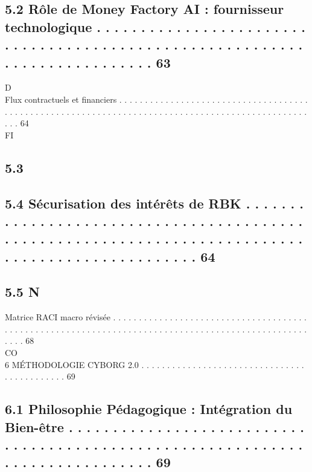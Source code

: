 \documentclass[12pt,landscape,a4paper]{article}
\begin{document}
\subsection{5.2     Rôle de Money Factory AI : fournisseur technologique . . . . . . . . . . . . . . . . . . . . . . . . . . . . . . . . . . . . . . . . . . . . . . . . . . . . . . . . . . . . . . . . . . . . . . . . . . . 63}
\vspace{0.5em}
\vspace{0.5em}
\vspace{0.5em}
\vspace{0.5em}
D\\
Flux contractuels et financiers . . . . . . . . . . . . . . . . . . . . . . . . . . . . . . . . . . . . . . . . . . . . . . . . . . . . . . . . . . . . . . . . . . . . . . . . . . . . . . . . . . . . . . . . . . . . . . . . . . . 64\\
\vspace{0.5em}
\vspace{0.5em}
\vspace{0.5em}
\vspace{0.5em}
FI\\
\subsection{5.3}
\subsection{5.4     Sécurisation des intérêts de RBK . . . . . . . . . . . . . . . . . . . . . . . . . . . . . . . . . . . . . . . . . . . . . . . . . . . . . . . . . . . . . . . . . . . . . . . . . . . . . . . . . . . . . . . . . . . . . . . . . 64}
\subsection{5.5                                                                         N}
Matrice RACI macro révisée . . . . . . . . . . . . . . . . . . . . . . . . . . . . . . . . . . . . . . . . . . . . . . . . . . . . . . . . . . . . . . . . . . . . . . . . . . . . . . . . . . . . . . . . . . . . . . . . . . . . . 68\\
CO\\
6       MÉTHODOLOGIE CYBORG 2.0 . . . . . . . . . . . . . . . . . . . . . . . . . . . . . . . . . . . . . . . . . . . . 69\\
\subsection{6.1     Philosophie Pédagogique : Intégration du Bien-être . . . . . . . . . . . . . . . . . . . . . . . . . . . . . . . . . . . . . . . . . . . . . . . . . . . . . . . . . . . . . . . . . . . . . . . . . . . . . . 69}
\end{document}
